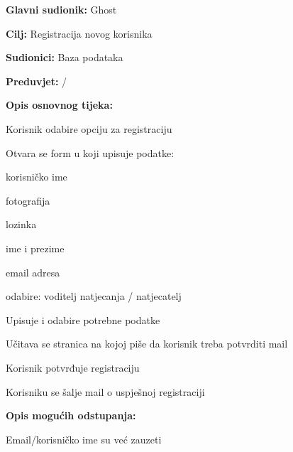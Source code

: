 						\noindent {}
					\begin{packed_item}
						
						\item \textbf{Glavni sudionik: } Ghost
						\item  \textbf{Cilj:} Registracija novog korisnika
						\item  \textbf{Sudionici:} Baza podataka
						\item  \textbf{Preduvjet:}  / 
						\item  \textbf{Opis osnovnog tijeka:}
						
						\item[] \begin{packed_enum}
							\item Korisnik odabire opciju za registraciju
							\item Otvara se form u koji upisuje podatke:
							\item[] \begin{packed_enum}
								
								\item korisničko ime
								\item fotografija
								\item lozinka
								\item ime i prezime
								\item email adresa
								\item odabire: voditelj natjecanja / natjecatelj
								
							\end{packed_enum}
							\item Upisuje i odabire potrebne podatke			
							\item Učitava se stranica na kojoj piše da korisnik treba potvrditi mail
							\item Korisnik potvrđuje registraciju
							\item Korisniku se šalje mail o uspješnoj registraciji
						\end{packed_enum}
						
						\item  \textbf{Opis mogućih odstupanja:}
						
						\item[] \begin{packed_item}
							
							\item[2.a]Email/korisničko ime su već zauzeti
							\item[] \begin{packed_enum}
								

\end{packed_enum}
\end{packed_item}
\end{packed_item}

